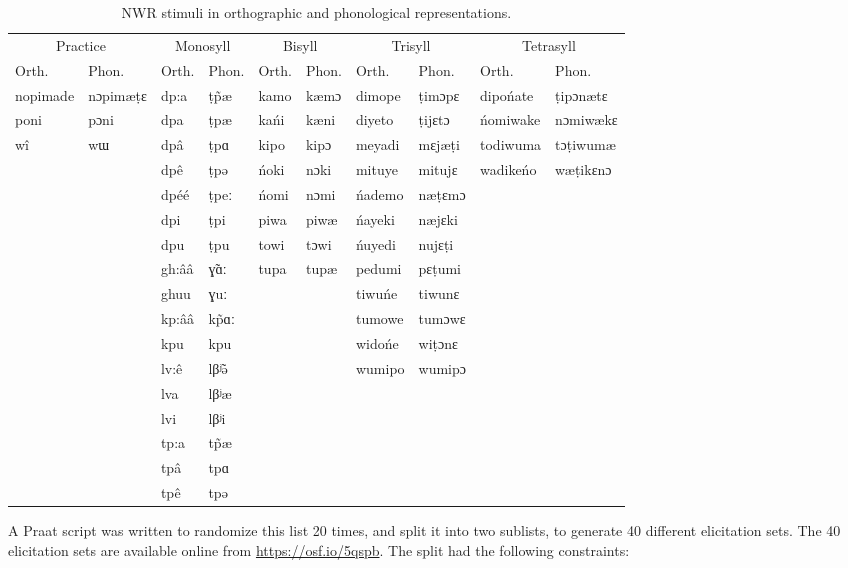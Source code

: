 \documentclass[english,,man,floatsintext]{apa6}
\begin{document}
\begin{table}

\caption{\label{tab:tab2-stims}NWR stimuli in orthographic and phonological representations.}
\centering
\begin{tabular}[t]{llllllllll}
\toprule
\multicolumn{2}{c}{Practice} & \multicolumn{2}{c}{Monosyll} & \multicolumn{2}{c}{Bisyll} & \multicolumn{2}{c}{Trisyll} & \multicolumn{2}{c}{Tetrasyll} \\
\cmidrule(l{3pt}r{3pt}){1-2} \cmidrule(l{3pt}r{3pt}){3-4} \cmidrule(l{3pt}r{3pt}){5-6} \cmidrule(l{3pt}r{3pt}){7-8} \cmidrule(l{3pt}r{3pt}){9-10}
Orth. & Phon. & Orth. & Phon. & Orth. & Phon. & Orth. & Phon. & Orth. & Phon.\\
\midrule
nopimade & nɔpimæṭɛ & dp:a & ṭp̃æ & kamo & kæmɔ & dimope & ṭimɔpɛ & dipońate & ṭipɔnætɛ\\
poni & pɔni & dpa & ṭpæ & kańi & kæni & diyeto & ṭijɛtɔ & ńomiwake & nɔmiwækɛ\\
wî & wɯ & dpâ & ṭpɑ & kipo & kipɔ & meyadi & mɛjæṭi & todiwuma & tɔṭiwumæ\\
 &  & dpê & ṭpə & ńoki & nɔki & mituye & mitujɛ & wadikeńo & wæṭikɛnɔ\\
 &  & dpéé & ṭpeː & ńomi & nɔmi & ńademo & næṭɛmɔ &  & \\
\addlinespace
 &  & dpi & ṭpi & piwa & piwæ & ńayeki & næjɛki &  & \\
 &  & dpu & ṭpu & towi & tɔwi & ńuyedi & nujɛṭi &  & \\
 &  & gh:ââ & ɣ̃ɑː & tupa & tupæ & pedumi & pɛṭumi &  & \\
 &  & ghuu & ɣuː &  &  & tiwuńe & tiwunɛ &  & \\
 &  & kp:ââ & kp̃ɑː &  &  & tumowe & tumɔwɛ &  & \\
\addlinespace
 &  & kpu & kpu &  &  & widońe & wiṭɔnɛ &  & \\
 &  & lv:ê & lβʲ̃ə &  &  & wumipo & wumipɔ &  & \\
 &  & lva & lβʲæ &  &  &  &  &  & \\
 &  & lvi & lβʲi &  &  &  &  &  & \\
 &  & tp:a & tp̃æ &  &  &  &  &  & \\
\addlinespace
 &  & tpâ & tpɑ &  &  &  &  &  & \\
 &  & tpê & tpə &  &  &  &  &  & \\
\bottomrule
\end{tabular}
\end{table}

A Praat script was written to randomize this list 20 times, and split it
into two sublists, to generate 40 different elicitation sets. The 40
elicitation sets are available online from \url{https://osf.io/5qspb}.
The split had the following constraints:
\end{document}
